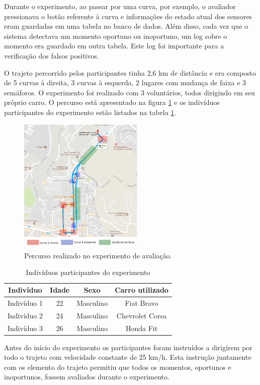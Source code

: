 Durante o experimento, ao passar por uma curva, por exemplo, o avaliador pressionava o botão
referente à curva e informações do estado atual dos sensores eram guardadas em uma tabela no banco de dados.
Além disso, cada vez que o sistema detectava um momento oportuno ou inoportuno, um log sobre o
momento era guardado em outra tabela. Este log foi importante para a verificação dos falsos positivos.

O trajeto percorrido pelos participantes tinha 2,6 km de distância e era composto de 5 curvas à direita,
3 curvas à esquerda, 2 lugares com mudança de faixa e 3 semáforos. O experimento foi realizado com 3
voluntários, todos dirigindo em seu próprio carro. O percurso está apresentado na figura \ref{percurso} e os
indivíduos participantes do experimento estão listados na tabela \ref{participantes}.

\begin{figure}[H]
\centering
\includegraphics[width=0.53\textwidth]{images/percurso.png}
\caption{Percurso realizado no experimento de avaliação.}
\label{percurso}
\end{figure}

\begin{table}[h]
\centering
\caption{Indivíduos participantes do experimento}
\label{participantes}
\begin{tabular}{|c|c|c|c|}
\hline
\textbf{Indivíduo} & \textbf{Idade} & \textbf{Sexo} & \textbf{Carro utilizado} \\ \hline
Indivíduo 1        & 22             & Masculino     & Fiat Bravo               \\ \hline
Indivíduo 2        & 24             & Masculino     & Chevrolet Corsa          \\ \hline
Indivíduo 3        & 26             & Masculino     & Honda Fit                \\ \hline
\end{tabular}
\end{table}

Antes do início do experimento os participantes foram instruídos a dirigirem por todo o trajeto com
velocidade constante de 25 km/h. Esta instrução juntamente com os elemento do trajeto permitiu que todos
os momentos, oportunos e inoportunos, fossem avaliados durante o experimento.
